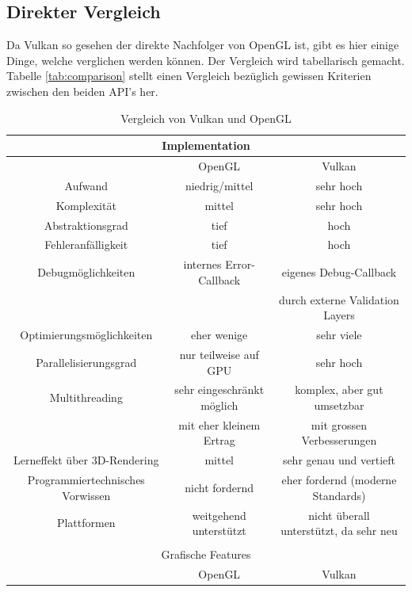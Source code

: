 \documentclass[titlepage, 11pt, a4paper, ngerman]{article}
\begin{document}
\subsection{Direkter Vergleich}
Da Vulkan so gesehen der direkte Nachfolger von \acrshort{OpenGL} ist, gibt es hier einige Dinge, welche verglichen werden können. Der Vergleich wird tabellarisch gemacht. Tabelle \ref{tab:comparison} stellt einen Vergleich bezüglich gewissen Kriterien zwischen den beiden \acrshort{API}'s her.
\begin{table}[ht]
    \centering
    \caption[Vergleich von Vulkan und \acrshort{OpenGL}]{Vergleich von Vulkan und \acrshort{OpenGL}}
    \bigbreak
    \begin{tabular}{|c||c|c|}
        \hline
        \multicolumn{3}{|c|}{Implementation} \\
        \hline
        \hline
         & \acrshort{OpenGL} & Vulkan \\
        \hline
        Aufwand & niedrig/mittel & sehr hoch \\
        Komplexität & mittel & sehr hoch \\
        Abstraktionsgrad & tief & hoch \\
        Fehleranfälligkeit & tief & hoch \\ 
        Debugmöglichkeiten & internes Error-Callback & eigenes Debug-Callback \\ & & durch externe Validation Layers \\
        Optimierungsmöglichkeiten & eher wenige & sehr viele \\
        Parallelisierungsgrad & nur teilweise auf GPU & sehr hoch \\
        \gls{Multithreading} & sehr eingeschränkt möglich & komplex, aber gut umsetzbar \\ & mit eher kleinem Ertrag & mit grossen Verbesserungen \\
        Lerneffekt über 3D-\gls{Rendering} & mittel & sehr genau und vertieft \\
        Programmiertechnisches Vorwissen & nicht fordernd & eher fordernd (moderne Standards) \\
        Plattformen & weitgehend unterstützt & nicht überall unterstützt, da sehr neu \\
        \hline
        \multicolumn{3}{c}{} \\
        \hline
        \multicolumn{3}{|c|}{Grafische Features} \\
        \hline
        \hline
         & \acrshort{OpenGL} & Vulkan \\

\end{tabular}
\end{table}
\end{document}
